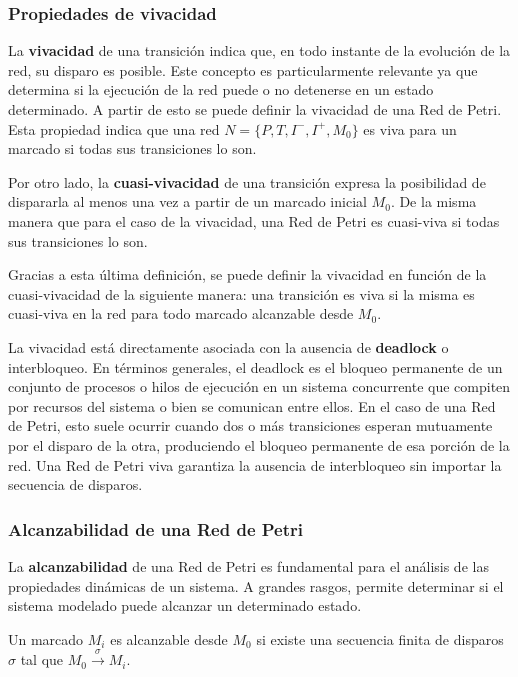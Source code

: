 \subsubsection{Propiedades de vivacidad}
La \textbf{vivacidad} de una transición indica que, en todo instante de la  evolución de la red, su disparo es posible. Este concepto es particularmente relevante ya que determina si la ejecución de la red puede  o no detenerse en un estado determinado. A partir de esto se puede definir la vivacidad de una Red de Petri. Esta propiedad indica que una red $N = \{P, T, I^- , I^+ , M_0 \}$ es viva para un marcado si todas sus transiciones lo son.

Por otro lado, la \textbf{cuasi-vivacidad} de una transición expresa la posibilidad de dispararla al menos una vez a partir de un marcado inicial $M_0$. De la misma manera que para el caso de la vivacidad, una Red de Petri es cuasi-viva si todas sus transiciones lo son.

Gracias a esta última definición, se puede definir la vivacidad en función de la cuasi-vivacidad de la siguiente manera: una transición es viva si la misma es cuasi-viva en la red para todo marcado alcanzable desde $M_0$. \\ \par

\noindent La vivacidad está directamente asociada con la ausencia de \textbf{deadlock} o interbloqueo. En términos generales, el deadlock es el bloqueo permanente de un conjunto de procesos o hilos de ejecución en un sistema concurrente que compiten por recursos del sistema o bien se comunican entre ellos. En el caso de una Red de Petri, esto suele ocurrir cuando dos o más transiciones esperan mutuamente por el disparo de la otra, produciendo el bloqueo permanente de esa porción de la red. 
Una Red de Petri viva garantiza la ausencia de interbloqueo sin importar la secuencia de disparos.

\subsubsection{Alcanzabilidad de una Red de Petri}
La \textbf{alcanzabilidad} de una Red de Petri es fundamental para el análisis de las propiedades dinámicas de un sistema. A grandes rasgos, permite determinar si el sistema modelado puede alcanzar un determinado estado.

Un marcado $M_i$ es alcanzable desde $M_0$ si existe una secuencia finita de disparos $\sigma$ tal que $M_0 \xrightarrow{\sigma} M_i$.

